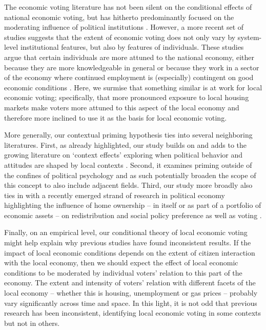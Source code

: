 \documentclass[12pt,a4paper]{article}
\begin{document}
	The economic voting literature has not been silent on the conditional effects of national economic voting, but has hitherto predominantly focused on the moderating influence of political institutions \cite[cf.]{powell1993cross, duch2008economic}. However, a more recent set of studies suggests that the extent of economic voting does not only vary by system-level institutional features, but also by features of individuals. These studies argue that certain individuals are more attuned to the national economy, either because they are more knowledgeable in general \citep{vries2014holding} or because they work in a sector of the economy where continued employment is (especially) contingent on good economic conditions \citep{singer2011says, singer2011voters,singer2013goes, fossati2014economic}. Here, we surmise that something similar is at work for local economic voting; specifically, that more pronounced exposure to local housing markets make voters more attuned to this aspect of the local economy and therefore more inclined to use it as the basis for local economic voting.
	
	More generally, our contextual priming hypothesis ties into several neighboring literatures. First, as already highlighted, our study builds on and adds to the growing literature on `context effects' exploring when political behavior and attitudes are shaped by local contexts \citep[e.g.,][]{hopkins2010politicized,danckert2017reacting}. Second, it examines priming outside of the confines of political psychology and as such potentially broaden the scope of this concept to also include adjacent fields. Third, our study more broadly also ties in with a recently emerged strand of research in political economy highlighting the influence of home ownership -- in itself or as part of a portfolio of economic assets -- on redistribution and social policy preference as well as voting \citep{ansell2014political,nadeau2010patrimonial,stubager2013reaching}. 
	
	Finally, on an empirical level, our conditional theory of local economic voting might help explain why previous studies have found inconsistent results. If the impact of local economic conditions depends on the extent of citizen interaction with the local economy, then we should expect the effect of local economic conditions to be moderated by individual voters’ relation to this part of the economy. The extent and intensity of voters’ relation with different facets of the local economy – whether this is housing, unemployment or gas prices – probably vary significantly across time and space. In this light, it is not odd that previous research has been inconsistent, identifying local economic voting in some contexts but not in others.
	
\end{document}
